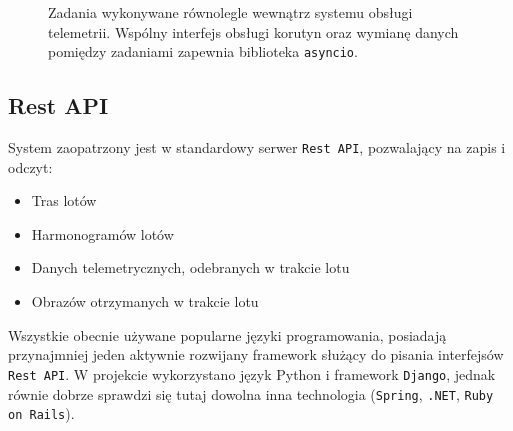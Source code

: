 \begin{figure}[H]
	\centering\small
	\caption{
		Zadania wykonywane równolegle wewnątrz systemu obsługi telemetrii.
		Wspólny interfejs obsługi korutyn oraz wymianę danych pomiędzy
		zadaniami zapewnia biblioteka \texttt{asyncio}.	
	}
	\label{telemetry_backend_asyncio}


\begin{center}
\end{center}
\end{figure}


\subsection{Rest API}

System zaopatrzony jest w standardowy serwer
\texttt{Rest API}\cite{principled_design_of_modern_web_apps},
pozwalający na zapis i odczyt:

\begin{itemize}
	\item Tras lotów
	\item Harmonogramów lotów
	\item Danych telemetrycznych, odebranych w trakcie lotu
	\item Obrazów otrzymanych w trakcie lotu
\end{itemize}

Wszystkie obecnie używane popularne języki programowania,
posiadają przynajmniej jeden aktywnie rozwijany framework 
służący do pisania interfejsów \texttt{Rest API}. W projekcie
wykorzystano język Python i framework \texttt{Django},
jednak równie dobrze sprawdzi się tutaj dowolna inna technologia
(\texttt{Spring}, \texttt{.NET}, \texttt{Ruby on Rails}).

